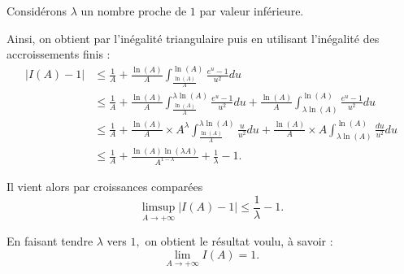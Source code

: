 Considérons $\lambda$ un nombre proche de $1$ par valeur inférieure.

Ainsi, on obtient par l'inégalité triangulaire puis en utilisant l'inégalité des accroissements finis :
\begin{align*}
\vert I(A)-1 \vert  & \leq \frac{1}{A}+\frac{\ln(A)}{A}\int_{\frac{\ln(A)}{A}}^{\ln(A)}\frac{e^{u}-1}{u^{2}}du\\
& \leq \frac{1}{A}+\frac{\ln(A)}{A}\int_{\frac{\ln(A)}{A}}^{\lambda \ln(A)}\frac{e^{u}-1}{u^{2}}du+ \frac{\ln(A)}{A}\int_{\lambda \ln(A)}^{\ln(A)}\frac{e^{u}-1}{u^{2}}du\\
& \leq \frac{1}{A}+\frac{\ln(A)}{A}\times A^{\lambda}\int_{\frac{\ln(A)}{A}}^{\lambda \ln(A)}\frac{u}{u^{2}}du+ \frac{\ln(A)}{A}\times A \int_{\lambda \ln(A)}^{\ln(A)}\frac{du}{u^{2}}du\\
& \leq \frac{1}{A}+\frac{\ln(A)\ln(\lambda A)}{A^{1-\lambda}}+\frac{1}{\lambda}-1.
\end{align*}

Il vient alors par croissances comparées 
$$\limsup_{A\rightarrow +\infty} \vert I(A)-1\vert \leq \frac{1}{\lambda}-1.$$

En faisant tendre $\lambda$ vers $1,$ on obtient le résultat voulu, à savoir : $$\lim_{A\rightarrow +\infty} I(A)=1.$$